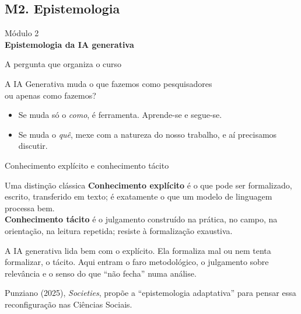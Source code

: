 \documentclass[11pt,aspectratio=169,t]{beamer}
\newcommand{\transicao}[2]{%
  \begin{frame}[plain]
    \centering
    \vspace*{2.2cm}
    {\large\color{cinzaescuro} #1}\\[0.8cm]
    {\Large\color{azulUNI}\textbf{#2}}
  \end{frame}}
\begin{document}
\subsection{M2. Epistemologia}
\transicao{Módulo 2}{Epistemologia da IA generativa}
\begin{frame}{A pergunta que organiza o curso}
  \begin{block}{}
    \centering\large
    A IA Generativa muda \alert{o que} fazemos como pesquisadores\\
    ou apenas \alert{como} fazemos?
  \end{block}
  \pause
  \vfill
  \begin{itemize}
    \item Se muda só o \textit{como}, é ferramenta. Aprende-se e segue-se.
    \pause
    \item Se muda o \textit{quê}, mexe com a natureza do nosso trabalho, e aí precisamos discutir.
  \end{itemize}
\end{frame}
\begin{frame}{Conhecimento explícito e conhecimento tácito}
  \begin{block}{Uma distinção clássica}
    \textbf{Conhecimento explícito} é o que pode ser formalizado, escrito, transferido em texto; é exatamente o que um modelo de linguagem processa bem.\\[4pt]
    \textbf{Conhecimento tácito} é o julgamento construído na prática, no campo, na orientação, na leitura repetida; resiste à formalização exaustiva.
  \end{block}
  \pause
  \vfill
  \begin{alertblock}{}
    A IA generativa lida bem com o explícito. Ela formaliza mal ou nem tenta formalizar, o tácito. Aqui entram o faro metodológico, o julgamento sobre relevância e o senso do que ``não fecha'' numa análise.
  \end{alertblock}
  \pause
  \centering\scriptsize Punziano (2025), \textit{Societies}, propõe a ``epistemologia adaptativa'' para pensar essa reconfiguração nas Ciências Sociais.
\end{frame}
\end{document}

